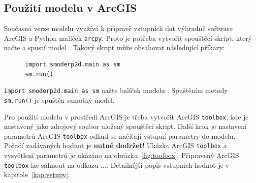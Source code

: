 \subsection{Použití modelu v ArcGIS}
  
  Současná verze modelu \smod využívá k přípravě vstupních dat výhradně software ArcGIS a Python malíček {\tt arcpy}. Proto je potřeba vytvořit spouštěcí skript, který načte a spustí model \smod. Takový skript může obsahovat následující příkazy:
    \begin{lstlisting}
      import smoderp2d.main as sm
      sm.run()
    \end{lstlisting}
  {\tt import smoderp2d.main as sm}  načte balíček modelu \smod. Spuštěním metody  {\tt sm.run()} je spuštěn samotný model. 
  
  Pro použití modelu v prostředí ArcGIS je třeba vytvořit ArcGIS {\tt toolbox}, kde je nastavený jako zdrojový soubor  uložený spouštěcí skript. Další krok je nastavení parametrů ArcGIS {\tt toolbox} odkud se načítají vstupní parametry do modelu. Pořadí zadávaných hodnot je {\bf nutné dodržet}! Ukázka ArcGIS {\tt toolbox} a vysvětlení parametrů je ukázáno na obrázku~\ref{fig:toolbox}. Připravený ArcGIS {\tt toolbox} lze sáhnout na odkazu .... Detailnější popis vstupních hodnot je v kapitole~\ref{kap:vstupy}.
  
  
  
